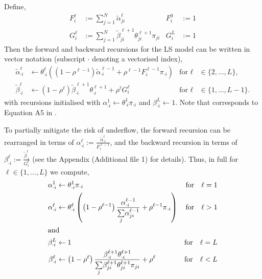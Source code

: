 \documentclass[pdflatex,referee,lineno,sn-nature]{sn-jnl}%
\begin{document}
Define,
\begin{align}
	F_i^\ell &:= \sum_{j=1}^N \tilde{\alpha}_{ji}^{\ell} & F_i^{0} &:= 1 \label{eq:F} \\
	G_i^\ell &:= \sum_{j=1}^N \tilde{\beta}_{ji}^{\ell+1}\theta_{ji}^{\ell+1} \pi_{ji} & G_i^L &:= 1 \label{eq:G}
\end{align}
Then the forward and backward recursions for the LS model can be written in vector notation (subscript \(\cdot\) denoting a vectorised index),
\begin{align}
	\tilde{\alpha}_{\cdot i}^{\ell} &\gets \theta^{\ell}_{\cdot i} \left( \left(1-\rho^{\ell-1}\right) \tilde{\alpha}_{\cdot i}^{\ell-1} + \rho^{\ell-1} F_i^{\ell-1} \pi_{\cdot i} \right) & \text{for } \ell &\in \{2,\dots,L\}, \label{eq:raw_forward} \\
	\tilde{\beta}_{\cdot i}^{\ell} &\gets \left( 1- \rho^{\ell}\right) \tilde{\beta}_{\cdot i}^{\ell+1} \theta^{\ell+1}_{\cdot i} + \rho^{\ell} G_i^\ell & \text{for } \ell &\in \{1,\dots,L-1\} \label{eq:raw_backward}.
\end{align}
with recursions initialised with \(\alpha_{\cdot i}^{1} \gets \theta^{1}_{\cdot i} \pi_{\cdot i}\) and \(\beta_{\cdot i}^{L} \gets 1\).
Note that  corresponds to Equation A5 in \cite{Li2213}.

To partially mitigate the risk of underflow, the forward recursion can be rearranged in terms of \(\alpha_{\cdot i}^{\ell} := \frac{\tilde{\alpha}_{\cdot i}^{\ell}}{ F_i^{\ell-1}}\), and the backward recursion in terms of \(\beta_{\cdot i}^{\ell} := \frac{\tilde{\beta}_{\cdot i}^{\ell}}{G_i^{\ell}}\) (see the Appendix (Additional file 1) for details).
Thus, in full for \(\ell \in \{1,\dots,L\}\) we compute,
\begin{align}
	\alpha_{\cdot i}^{1} &\gets \theta^{1}_{\cdot i} \pi_{\cdot i} &\textrm{for} \quad \ell = 1 \label{eq:fwd0} \\
	\alpha_{\cdot i}^{\ell} &\gets \theta^{\ell}_{\cdot i} \left( \left(1-\rho^{\ell-1}\right) \frac{\alpha_{\cdot i}^{\ell-1}}{\underset{j}{\sum} \alpha_{ji}^{\ell-1}} + \rho^{\ell-1} \pi_{\cdot i} \right) &\textrm{for} \quad \ell > 1 \label{eq:fwd1} \\ \intertext{and}
	\beta_{\cdot i}^{L} &\gets 1 &\textrm{for} \quad \ell = L \label{eq:bck0} \\
	\beta_{\cdot i}^{\ell} &\gets \left( 1- \rho^{\ell}\right) \frac{\beta_{\cdot i}^{\ell+1} \theta^{\ell+1}_{\cdot i}}{\underset{j}{\sum} \beta_{ji}^{\ell+1}\theta_{ji}^{\ell+1} \pi_{ji}} + \rho^\ell &\textrm{for} \quad \ell < L \label{eq:bck1}
\end{align}
\end{document}
